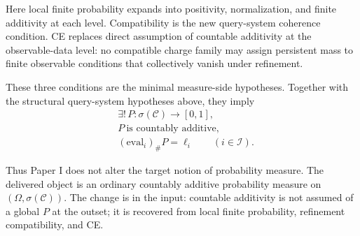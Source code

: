 \documentclass[11pt]{article}
\begin{document}
Here local finite probability expands into positivity, normalization, and finite
additivity at each level.  Compatibility is the new query-system coherence
condition.  CE replaces direct assumption of countable additivity at the
observable-data level: no compatible charge family may assign persistent mass to
finite observable conditions that collectively vanish under refinement.

These three conditions are the minimal measure-side hypotheses.  Together with
the structural query-system hypotheses above, they imply
\[
  \begin{aligned}
  &\exists!\,P:\sigma(\mathcal C)\to[0,1],\\
  &P\ \text{is countably additive},\\
  &(\mathrm{eval}_i)_\#P=\ell_i
    \qquad (i\in\mathcal I).
  \end{aligned}
\]

Thus Paper I does not alter the target notion of probability measure.  The
delivered object is an ordinary countably additive probability measure on
$(\Omega,\sigma(\mathcal C))$.  The change is in the input: countable
additivity is not assumed of a global $P$ at the outset; it is recovered from
local finite probability, refinement compatibility, and CE.
\end{document}
